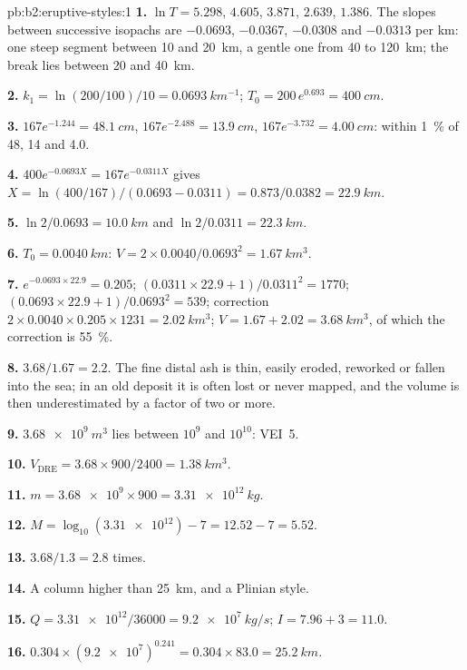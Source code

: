 \begin{solution}{pb:b2:eruptive-styles:1}
\textbf{1.} $\ln T = 5.298$, $4.605$, $3.871$, $2.639$, $1.386$. The slopes between
successive isopachs are $-0.0693$, $-0.0367$, $-0.0308$ and $-0.0313$ per km: one
steep segment between 10 and \qty{20}{km}, a gentle one from 40 to
\qty{120}{km}; the break lies between 20 and \qty{40}{km}.

\textbf{2.} $k_1 = \ln(200/100)/10 = \qty{0.0693}{km^{-1}}$; $T_0 = 200\,e^{0.693} =
\qty{400}{cm}$.

\textbf{3.} $167e^{-1.244} = \qty{48.1}{cm}$, $167e^{-2.488} = \qty{13.9}{cm}$,
$167e^{-3.732} = \qty{4.00}{cm}$: within \qty{1}{\percent} of 48, 14 and 4.0.

\textbf{4.} $400e^{-0.0693X} = 167e^{-0.0311X}$ gives $X = \ln(400/167)/(0.0693 -
0.0311) = 0.873/0.0382 = \qty{22.9}{km}$.

\textbf{5.} $\ln2/0.0693 = \qty{10.0}{km}$ and $\ln2/0.0311 = \qty{22.3}{km}$.

\textbf{6.} $T_0 = \qty{0.0040}{km}$: $V = 2\times0.0040/0.0693^2 =
\qty{1.67}{km^3}$.

\textbf{7.} $e^{-0.0693\times22.9} = 0.205$; $(0.0311\times22.9 + 1)/0.0311^2 = 1770$;
$(0.0693\times22.9 + 1)/0.0693^2 = 539$; correction $2\times0.0040\times0.205\times1231 =
\qty{2.02}{km^3}$; $V = 1.67 + 2.02 = \qty{3.68}{km^3}$, of which the correction is
\qty{55}{\percent}.

\textbf{8.} $3.68/1.67 = 2.2$. The fine distal ash is thin, easily eroded,
reworked or fallen into the sea; in an old deposit it is often lost or never
mapped, and the volume is then underestimated by a factor of two or more.

\textbf{9.} $\qty{3.68e9}{m^3}$ lies between $10^9$ and $10^{10}$: VEI~5.

\textbf{10.} $V_{\mathrm{DRE}} = 3.68\times900/2400 = \qty{1.38}{km^3}$.

\textbf{11.} $m = \num{3.68e9}\times900 = \qty{3.31e12}{kg}$.

\textbf{12.} $M = \log_{10}(\num{3.31e12}) - 7 = 12.52 - 7 = 5.52$.

\textbf{13.} $3.68/1.3 = 2.8$ times.

\textbf{14.} A column higher than \qty{25}{km}, and a Plinian style.

\textbf{15.} $Q = \num{3.31e12}/36000 = \qty{9.2e7}{kg/s}$; $I = 7.96 + 3 = 11.0$.

\textbf{16.} $0.304\times(\num{9.2e7})^{0.241} = 0.304\times83.0 = \qty{25.2}{km}$.


\end{solution}
